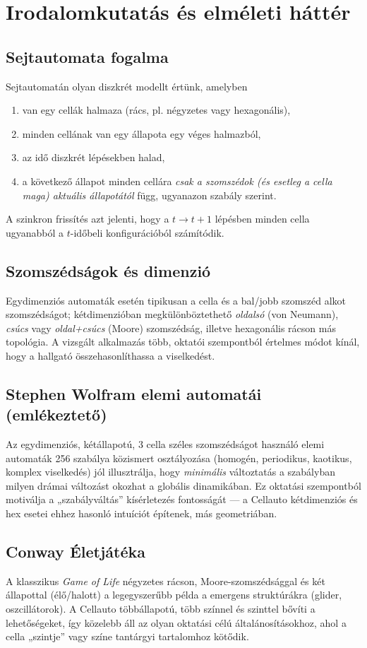 \chapter{Irodalomkutatás és elméleti háttér}

\section{Sejtautomata fogalma}
Sejtautomatán olyan diszkrét modellt értünk, amelyben
\begin{enumerate}
  \item van egy cellák halmaza (rács, pl. négyzetes vagy hexagonális),
  \item minden cellának van egy állapota egy véges halmazból,
  \item az idő diszkrét lépésekben halad,
  \item a következő állapot minden cellára \emph{csak a szomszédok (és esetleg a cella maga) aktuális állapotától} függ, ugyanazon szabály szerint.
\end{enumerate}
A szinkron frissítés azt jelenti, hogy a $t\rightarrow t{+}1$ lépésben minden cella ugyanabból a $t$-időbeli konfigurációból számítódik.

\section{Szomszédságok és dimenzió}
Egydimenziós automaták esetén tipikusan a cella és a bal/jobb szomszéd alkot szomszédságot; kétdimenzióban megkülönböztethető \emph{oldalsó} (von Neumann), \emph{csúcs} vagy \emph{oldal+csúcs} (Moore) szomszédság, illetve hexagonális rácson más topológia. A vizsgált alkalmazás több, oktatói szempontból értelmes módot kínál, hogy a hallgató összehasonlíthassa a viselkedést.

\section{Stephen Wolfram elemi automatái (emlékeztető)}
Az egydimenziós, kétállapotú, 3 cella széles szomszédságot használó elemi automaták 256 szabálya közismert osztályozása (homogén, periodikus, kaotikus, komplex viselkedés) jól illusztrálja, hogy \emph{minimális} változtatás a szabályban milyen drámai változást okozhat a globális dinamikában. Ez oktatási szempontból motiválja a „szabályváltás” kísérletezés fontosságát — a Cellauto kétdimenziós és hex esetei ehhez hasonló intuíciót építenek, más geometriában.

\section{Conway Életjátéka}
A klasszikus \emph{Game of Life} négyzetes rácson, Moore-szomszédsággal és két állapottal (élő/halott) a legegyszerűbb példa a emergens struktúrákra (glider, oszcillátorok). A Cellauto többállapotú, több színnel és szinttel bővíti a lehetőségeket, így közelebb áll az olyan oktatási célú általánosításokhoz, ahol a cella „szintje” vagy színe tantárgyi tartalomhoz kötődik.

